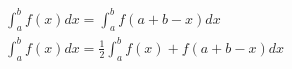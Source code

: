 \begin{align}
&\int^{b}_{a}f(x)dx = \int^{b}_{a}f(a+b-x)dx \\
&\int^{b}_{a}f(x)dx = \frac{1}{2}\int^{b}_{a}f(x)+f(a+b-x)dx
\end{align}
